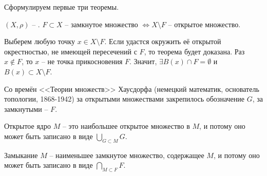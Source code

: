 \vspace{0.5cm}
Сформулируем первые три теоремы.
\vspace{0.5cm}

\begin{Theorem} \label{thm:thm_1_1}
$(X, \rho)$ -- \MS. $F \subset X$ -- замкнутое множество $\Longleftrightarrow X \setminus F$ -- открытое множество.
\end{Theorem}
\begin{Proof}
    Выберем любую точку $x \in X \setminus F$. Если удастся окружить её открытой окрестностью, не имеющей пересечений с $F$, то теорема будет доказана. Раз $x \not\in F$, то $x$ -- не точка прикосновения $F$.
    Значит, $\exists B(x) \cap F = \emptyset$ и $B(x) \subset X \setminus F$.
\end{Proof}

\vspace{0.5cm}

Со времён <<Теории множеств>> Хаусдорфа (немецкий математик, основатель топологии, 1868-1942) за открытыми множествами закрепилось обозначение $G$, за замкнутыми -- $F$.

Открытое ядро $M$ -- это наибольшее открытое множество в $M$, и потому оно может быть записано в виде $\bigcup\limits_{G \subset M} G$.

Замыкание $M$ -- наименьшее замкнутое множество, содержащее $M$, и потому оно может быть записано в виде $\bigcap\limits_{M \subset F} F$.

\vspace{0.5cm}

